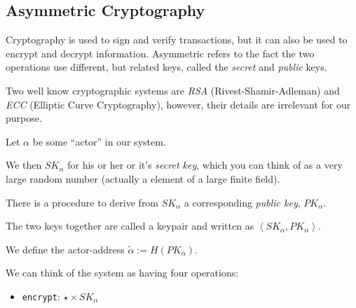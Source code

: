 \subsection{Asymmetric Cryptography}

Cryptography is used to sign and verify transactions, but it can also be used to encrypt and decrypt information.
Asymmetric refers to the fact the two operations use different, but related keys, called the \emph{secret} and \emph{public} keys.

Two well know cryptographic systems are \emph{RSA} (Rivest-Shamir-Adleman) and \emph{ECC} (Elliptic Curve Cryptography), however, their details are irrelevant for our purpose.

Let $\alpha$ be some ``actor'' in our system.

We then $SK_\alpha$ for his or her or it's \emph{secret key}, which you can think of as a very large random number (actually a element of a large finite field).

There is a procedure to derive from $SK_\alpha$ a corresponding \emph{public key}, $PK_\alpha$.

The two keys together are called a keypair and written as $\left< SK_\alpha, PK_\alpha \right>$.

We define the actor-address $\tilde{\alpha} := H(PK_\alpha)$.

We can think of the system as having four operations:

\begin{itemize}
\item \texttt{encrypt}: $\star \times SK_{\alpha} $
\end{itemize}
